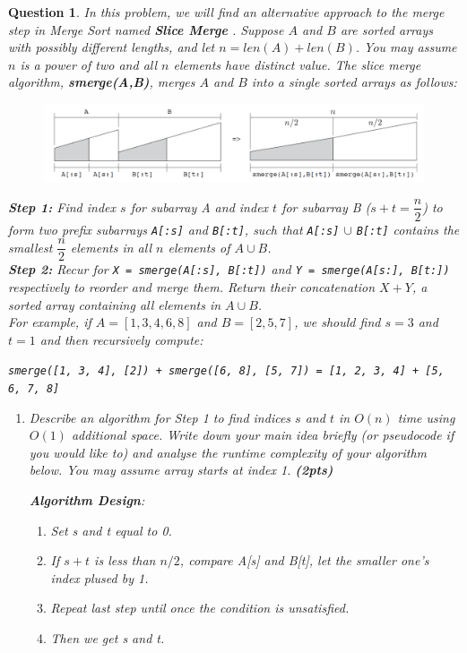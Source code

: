 \documentclass{article}
\newtheorem{Q}{Question}
\begin{document}
\begin{Q}
	In this problem, we will find an alternative approach to the merge step in Merge Sort named \textbf{Slice Merge} . Suppose $A$ and $B$ are sorted arrays with possibly different lengths, and let $n=len(A)+len(B)$. You may assume $n$ is a power of two and all $n$ elements have distinct value. The slice merge algorithm, \textbf{smerge(A,B)}, merges $A$ and $B$ into a single sorted arrays as follows:

	\begin{figure}[htbp]
		\centering
		\includegraphics[width=1.0\linewidth]{2}
	\end{figure}

	\textbf{Step 1:} Find index $s$ for subarray A and index $t$ for subarray B ($s+t=\dfrac{n}{2}$) to form two prefix subarrays \texttt{A[:s]} and \texttt{B[:t]}, such that \texttt{A[:s]} $\cup$ \texttt{B[:t]} contains the smallest $\dfrac{n}{2}$ elements in all $n$ elements of $A\cup B$.\\

	\textbf{Step 2:} Recur for \texttt{X = smerge(A[:s], B[:t])} and \texttt{Y = smerge(A[s:], B[t:])} respectively to reorder and merge them. Return their concatenation $X+Y$, a sorted array containing all elements in $A\cup B$.\\

	For example, if $A=[1, 3, 4, 6, 8]$ and $B=[2, 5, 7]$, we should find $s=3$ and $t=1$ and then recursively compute:

	\centerline{\texttt{smerge([1, 3, 4], [2]) + smerge([6, 8], [5, 7]) = [1, 2, 3, 4] + [5, 6, 7, 8]}}

	\vspace{0.5cm}
	\begin{enumerate}[1.]
		\item  Describe an algorithm for Step 1 to find indices $s$ and $t$ in $O(n)$ time using $O(1)$ additional space. Write down your main idea briefly (or pseudocode if you would like to) and analyse the runtime complexity of your algorithm below. You may assume array starts at index 1. \textbf{(2pts)}

		      \textbf{Algorithm Design}:
		      \begin{enumerate}
			      \item Set s and t equal to 0.
			      \item If $s+t$ is less than $n/2$, compare A[s] and B[t], let the smaller one's index plused by 1.
			      \item Repeat last step until once the condition is unsatisfied.
			      \item Then we get s and t.
		      \end{enumerate}


\end{enumerate}
\end{Q}
\end{document}
